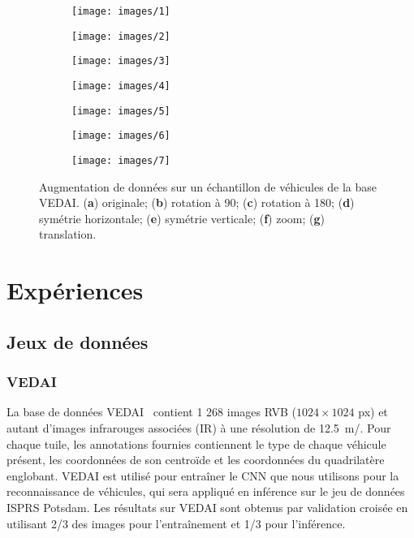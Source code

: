 \begin{figure}[t]
	\begin{subfigure}{0.135\textwidth}
    	\texttt{[image: images/1]}
        \caption{}
    \end{subfigure}
    \begin{subfigure}{0.135\textwidth}
    	\texttt{[image: images/2]}
        \caption{}
    \end{subfigure}
    \begin{subfigure}{0.1375\textwidth}
    	\texttt{[image: images/3]}
        \caption{}
    \end{subfigure}
    \begin{subfigure}{0.135\textwidth}
    	\texttt{[image: images/4]}
        \caption{}
    \end{subfigure}
    \begin{subfigure}{0.135\textwidth}
    	\texttt{[image: images/5]}
        \caption{}
    \end{subfigure}
    \begin{subfigure}{0.135\textwidth}
    	\texttt{[image: images/6]}
        \caption{}
    \end{subfigure}
    \begin{subfigure}{0.135\textwidth}
    	\texttt{[image: images/7]}
        \caption{}
    \end{subfigure}\vspace{-12pt}
	\caption{Augmentation de données sur un échantillon de véhicules de la base \gls{VEDAI}. (\textbf{a}) originale; (\textbf{b}) rotation à 90\degre; (\textbf{c}) rotation à 180\degre; (\textbf{d}) symétrie horizontale; (\textbf{e}) symétrie verticale; (\textbf{f}) zoom; (\textbf{g}) translation.}
    \label{fig:augmented_car}
\end{figure}

\section{Expériences}
\unskip
\subsection{Jeux de données}
\unskip
\subsubsection{VEDAI}

La base de données \gls{VEDAI}~\cite{razakarivony_vehicle_2016} contient 1 268 images \gls{RVB} ($1024 \times 1024$ px) et autant d'images infrarouges associées (IR) à une résolution de \SI{12,5}{\meter/\px}. Pour chaque tuile, les annotations fournies contiennent le type de chaque véhicule présent, les coordonnées de son centroïde et les coordonnées du quadrilatère englobant. \gls{VEDAI} est utilisé pour entraîner le \gls{CNN} que nous utilisons pour la reconnaissance de véhicules, qui sera appliqué en inférence sur le jeu de données \gls{ISPRS}  Potsdam. Les résultats sur \gls{VEDAI} sont obtenus par validation croisée en utilisant 2/3 des images pour l'entraînement et 1/3 pour l'inférence.

